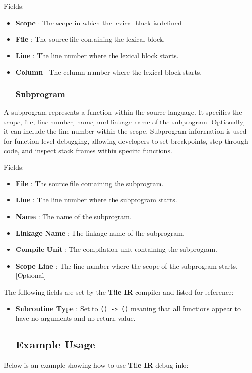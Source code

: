 \documentclass{article}
\begin{document}
Fields:


\begin{itemize}
\item \textbf{Scope} : The scope in which the lexical block is defined.
\item \textbf{File} : The source file containing the lexical block.
\item \textbf{Line} : The line number where the lexical block starts.
\item \textbf{Column} : The column number where the lexical block starts.


\subsubsection{Subprogram}

\end{itemize}
A subprogram represents a function within the source language. It specifies the scope, file, line number, name, and linkage name of the subprogram. Optionally, it can include the line number within the scope. Subprogram information is used for function level debugging, allowing developers to set breakpoints, step through code, and inspect stack frames within specific functions.


Fields:


\begin{itemize}
\item \textbf{File} : The source file containing the subprogram.
\item \textbf{Line} : The line number where the subprogram starts.
\item \textbf{Name} : The name of the subprogram.
\item \textbf{Linkage Name} : The linkage name of the subprogram.
\item \textbf{Compile Unit} : The compilation unit containing the subprogram.
\item \textbf{Scope Line} : The line number where the scope of the subprogram starts. [Optional]

\end{itemize}
The following fields are set by the \textbf{Tile IR} compiler and listed for reference:


\begin{itemize}
\item \textbf{Subroutine Type} : Set to \texttt{() -> ()} meaning that all functions appear to have no arguments and no return value.


\subsection{Example Usage}

\end{itemize}
Below is an example showing how to use \textbf{Tile IR} debug info:
\end{document}
